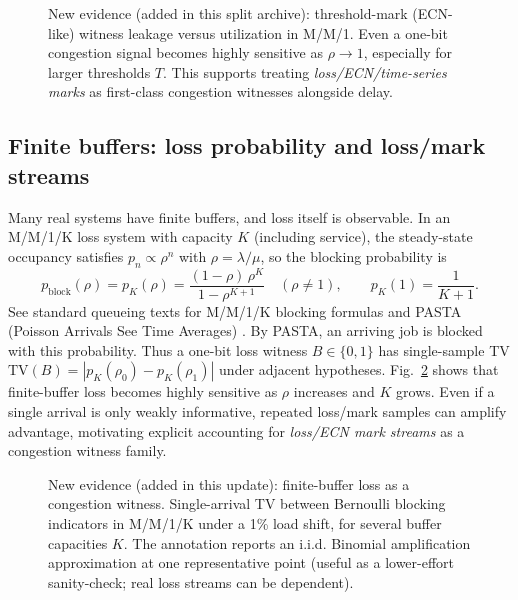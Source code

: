 \documentclass[11pt]{article}
\theoremstyle{definition}
\theoremstyle{remark}
\newcommand{\TV}{\mathrm{TV}}
\begin{document}
\begin{figure}[t]
\centering
{}
\caption{New evidence (added in this split archive): threshold-mark (ECN-like) witness leakage versus utilization in M/M/1.
Even a one-bit congestion signal becomes highly sensitive as $\rho\to 1$, especially for larger thresholds $T$.
This supports treating \emph{loss/ECN/time-series marks} as first-class congestion witnesses alongside delay.}
\label{fig:ecn}
\end{figure}

\subsection{Finite buffers: loss probability and loss/mark streams}
Many real systems have finite buffers, and loss itself is observable.
In an M/M/1/K loss system with capacity $K$ (including service), the steady-state occupancy satisfies
$p_n \propto \rho^n$ with $\rho=\lambda/\mu$, so the blocking probability is
\[p_{\mathrm{block}}(\rho)=p_K(\rho)=\frac{(1-\rho)\,\rho^K}{1-\rho^{K+1}}\quad (\rho\neq 1),\qquad p_K(1)=\frac{1}{K+1}.\]
See standard queueing texts for M/M/1/K blocking formulas and PASTA (Poisson Arrivals See Time Averages) \cite{gross_harris,asmussen2003,wolff_pasta1982}.
By PASTA, an arriving job is blocked with this probability.
Thus a one-bit loss witness $B\in\{0,1\}$ has single-sample TV
$\TV(B)=|p_K(\rho_0)-p_K(\rho_1)|$ under adjacent hypotheses.
Fig.~\ref{fig:mm1k} shows that finite-buffer loss becomes highly sensitive as $\rho$ increases and $K$ grows.
Even if a single arrival is only weakly informative, repeated loss/mark samples can amplify advantage, motivating explicit accounting for 
\emph{loss/ECN mark streams} as a congestion witness family.

\begin{figure}[t]
\centering
{}
\caption{New evidence (added in this update): finite-buffer loss as a congestion witness.
Single-arrival TV between Bernoulli blocking indicators in M/M/1/K under a 1\% load shift, for several buffer capacities $K$.
The annotation reports an i.i.d. Binomial amplification approximation at one representative point (useful as a lower-effort sanity-check; real loss streams can be dependent).
}
\label{fig:mm1k}
\end{figure}
\end{document}
